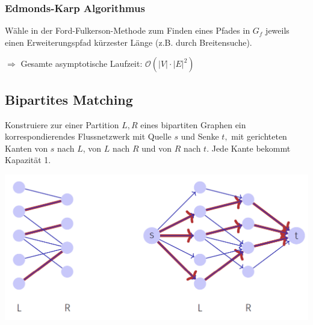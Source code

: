 \vspace{-4pt}
\begin{sectionbox}
\subsubsection{Edmonds-Karp Algorithmus}\smallskip
Wähle in der Ford-Fulkerson-Methode zum Finden eines Pfades in $G_{f}$ jeweils einen Erweiterungspfad kürzester Länge (z.B. durch Breitensuche).\par $\Rightarrow$ Gesamte asymptotische Laufzeit: $\mathcal{O}\left(|V| \cdot|E|^{2}\right)$

\end{sectionbox}
\vspace{-4pt}
\begin{sectionbox}
\subsection{Bipartites Matching}\smallskip
Konstruiere zur einer Partition $L, R$ eines bipartiten Graphen ein korrespondierendes Flussnetzwerk mit Quelle $s$ und Senke $t,$ mit gerichteten Kanten von $s$ nach $L$, von $L$ nach $R$ und von $R$ nach $t$. Jede Kante bekommt Kapazität 1.\par
\includegraphics[width = \columnwidth]{../img/biMa.png}\par\smallskip
\end{sectionbox}
\vspace{-4pt}
